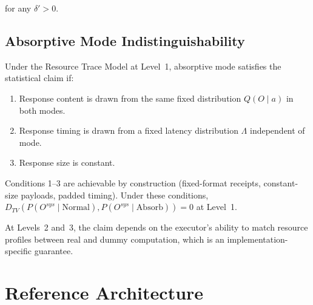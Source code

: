 \documentclass[11pt,a4paper]{article}
\begin{document}
for any $\delta' > 0$.

\subsection{Absorptive Mode Indistinguishability}

Under the Resource Trace Model at Level~1, absorptive mode satisfies the statistical claim if:

\begin{enumerate}
  \item Response content is drawn from the same fixed distribution $Q(O \mid a)$ in both modes.
  \item Response timing is drawn from a fixed latency distribution $\Lambda$ independent of mode.
  \item Response size is constant.
\end{enumerate}

Conditions 1--3 are achievable by construction (fixed-format receipts, constant-size payloads, padded timing). Under these conditions, $D_{TV}(P(O^{sys} \mid \text{Normal}), P(O^{sys} \mid \text{Absorb})) = 0$ at Level~1.

At Levels~2 and~3, the claim depends on the executor's ability to match resource profiles between real and dummy computation, which is an implementation-specific guarantee.

\section{Reference Architecture}
\end{document}
